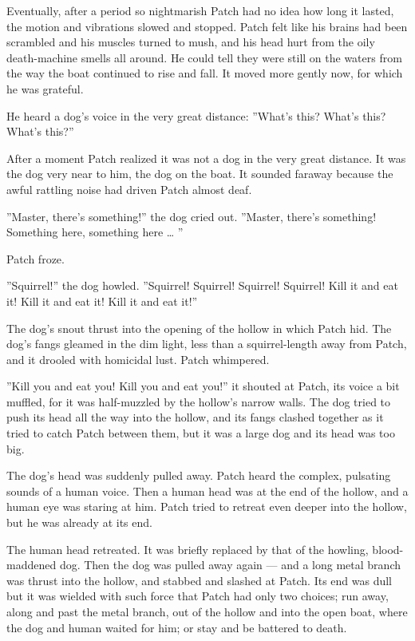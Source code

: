 \documentclass[12pt]{book}
\begin{document}
Eventually, after a period so nightmarish Patch had no idea how long
it lasted, the motion and vibrations slowed and stopped. Patch felt
like his brains had been scrambled and his muscles turned to mush, and
his head hurt from the oily death-machine smells all around. He could
tell they were still on the waters from the way the boat continued to
rise and fall. It moved more gently now, for which he was grateful.

He heard a dog's voice in the very great distance: ''What's this?
What's this? What's this?''

After a moment Patch realized it was not a dog in the very great
distance. It was the dog very near to him, the dog on the boat. It
sounded faraway because the awful rattling noise had driven Patch
almost deaf.

''Master, there's something!'' the dog cried out. ''Master, there's
something! Something here, something here \ldots{} ''

Patch froze.

''Squirrel!'' the dog howled. ''Squirrel! Squirrel! Squirrel!
Squirrel! Kill it and eat it! Kill it and eat it! Kill it and eat
it!''

The dog's snout thrust into the opening of the hollow in which Patch
hid. The dog's fangs gleamed in the dim light, less than a
squirrel-length away from Patch, and it drooled with homicidal
lust. Patch whimpered.

''Kill you and eat you! Kill you and eat you!'' it shouted at Patch,
its voice a bit muffled, for it was half-muzzled by the hollow's
narrow walls. The dog tried to push its head all the way into the
hollow, and its fangs clashed together as it tried to catch Patch
between them, but it was a large dog and its head was too big.

The dog's head was suddenly pulled away. Patch heard the complex,
pulsating sounds of a human voice. Then a human head was at the end of
the hollow, and a human eye was staring at him. Patch tried to retreat
even deeper into the hollow, but he was already at its end.

The human head retreated. It was briefly replaced by that of the
howling, blood-maddened dog. Then the dog was pulled away again ---
and a long metal branch was thrust into the hollow, and stabbed and
slashed at Patch. Its end was dull but it was wielded with such force
that Patch had only two choices; run away, along and past the metal
branch, out of the hollow and into the open boat, where the dog and
human waited for him; or stay and be battered to death.
\end{document}
